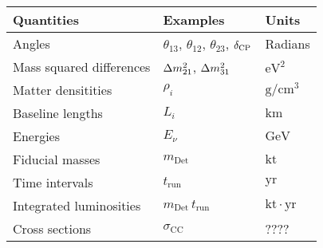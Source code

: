 \begin{table}[t]
\begin{center}
\begin{tabular}{lll}
\hline
Quantities & Examples & Units \\
\hline
Angles & $\theta_{13}$, $\theta_{12}$, $\theta_{23}$, $\delta_{\mathrm{CP}}$ & Radians  \\
Mass squared differences & $\Delta m_{21}^2$, $\Delta m_{31}^2$ & $\mathrm{eV}^2$ \\
Matter densitities & $\rho_i$ & $\mathrm{g}/\mathrm{cm}^3$ \\
Baseline lengths & $L_i$ & $\mathrm{km}$ \\
Energies & $E_\nu$ & $\mathrm{GeV}$ \\  
Fiducial masses & $m_{\mathrm{Det}}$ & $\mathrm{kt}$ \\
Time intervals & $t_{\mathrm{run}}$ & $\mathrm{yr}$ \\
Integrated luminosities & $m_{\mathrm{Det}} \, t_{\mathrm{run}}$ & $\mathrm{kt \cdot yr}$ \\
Cross sections & $\sigma_{\mathrm{CC}}$ &  ???? \\
\hline
\end{tabular}
\end{center}
\end{table}

